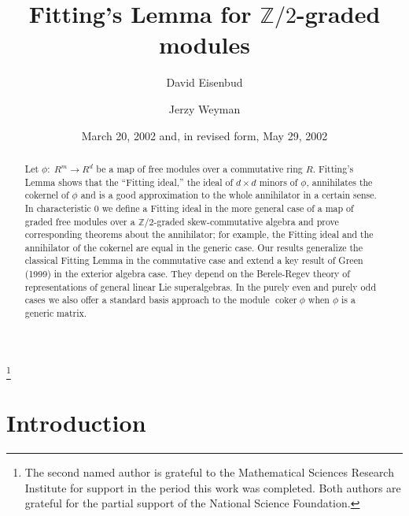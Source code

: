 \documentclass{tran-l}
\theoremstyle{plain}
\theoremstyle{remark}
\theoremstyle{definition}
\begin{document}
\title{Fitting's Lemma for $\mathbb{Z}/2$-graded modules}
\author{David Eisenbud}
\address{Department of Mathematics, University of California, 
Berkeley, California 94720}
\author{Jerzy Weyman}
\address{Department of Mathematics, Northeastern  University,
Boston, Massachusetts 02115}
\thanks{The second named author is grateful to the
Mathematical Sciences Research Institute for support in the period this
work was completed. Both authors are grateful
for the partial support of the National Science Foundation.}
\date{March 20, 2002 and, in revised form, May 29, 2002}
\begin{abstract}Let $\phi :\; R^{m}\to R^{d}$
be a map of free modules over a commutative ring $R$.
Fitting's Lemma shows that the ``Fitting ideal,'' the
ideal of $d\times d$ minors of 
$\phi $, annihilates the cokernel of $\phi $ and 
is a good approximation to the whole annihilator in a certain
sense. In characteristic 0 we define a Fitting ideal
in the more general case of a map of graded
free modules over a $\mathbb{Z}/2$-graded skew-commutative algebra 
and prove corresponding theorems about the annihilator; for
example, the Fitting ideal and the annihilator of the cokernel are equal
in the generic case.
Our results generalize the
classical Fitting Lemma in the commutative case
and extend a key result of Green (1999) in the exterior algebra case.
They depend on the Berele-Regev theory of representations
of general linear Lie superalgebras. In the purely even and
purely odd cases we also offer a standard basis approach to
the module $\operatorname{coker}\phi $ when $\phi $ is a generic matrix.
\end{abstract}
\maketitle

\section*{Introduction}
\end{document}
